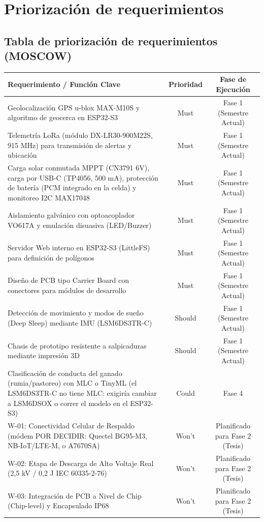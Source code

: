\section*{Priorización de requerimientos}
\subsection*{Tabla de priorización de requerimientos (MOSCOW)}

\begin{table}[H]
\centering
\small
\begin{tabularx}{\textwidth}{|X c c|}
\hline
\rowcolor{categorybg}
\textbf{Requerimiento / Función Clave} & \textbf{Prioridad} & \textbf{Fase de Ejecución} \\ \hline
Geolocalización GPS u-blox MAX-M10S y algoritmo de geocerca en ESP32-S3 & Must & Fase 1 (Semestre Actual) \\ \hline
Telemetría LoRa (módulo DX-LR30-900M22S, 915 MHz) para transmisión de alertas y ubicación & Must & Fase 1 (Semestre Actual) \\ \hline
Carga solar conmutada MPPT (CN3791 6V), carga por USB-C (TP4056, 500 mA), protección de batería (PCM integrado en la celda) y monitoreo I2C MAX17048 & Must & Fase 1 (Semestre Actual) \\ \hline
Aislamiento galvánico con optoacoplador VO617A y emulación disuasiva (LED/Buzzer) & Must & Fase 1 (Semestre Actual) \\ \hline
Servidor Web interno en ESP32-S3 (LittleFS) para definición de polígonos & Must & Fase 1 (Semestre Actual) \\ \hline
Diseño de PCB tipo Carrier Board con conectores para módulos de desarrollo & Must & Fase 1 (Semestre Actual) \\ \hline
Detección de movimiento y modos de sueño (Deep Sleep) mediante IMU (LSM6DS3TR-C) & Should & Fase 1 (Semestre Actual) \\ \hline
Chasis de prototipo resistente a salpicaduras mediante impresión 3D & Should & Fase 1 (Semestre Actual) \\ \hline
Clasificación de conducta del ganado (rumia/pastoreo) con MLC o TinyML (el LSM6DS3TR-C no tiene MLC: exigiría cambiar a LSM6DSOX o correr el modelo en el ESP32-S3) & Could & Fase 4 \\ \hline
\rowcolor{phase2orange}
W-01: Conectividad Celular de Respaldo (módem POR DECIDIR: Quectel BG95-M3, NB-IoT/LTE-M, o A7670SA) & Won't & Planificado para Fase 2 (Tesis) \\ \hline
\rowcolor{phase2orange}
W-02: Etapa de Descarga de Alto Voltaje Real (2,5 kV / 0,2 J IEC 60335-2-76) & Won't & Planificado para Fase 2 (Tesis) \\ \hline
\rowcolor{phase2orange}
W-03: Integración de PCB a Nivel de Chip (Chip-level) y Encapsulado IP68 & Won't & Planificado para Fase 2 (Tesis) \\ \hline
\end{tabularx}
\end{table}